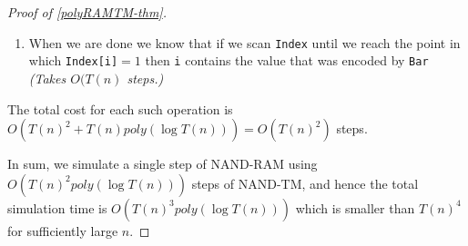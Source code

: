 \begin{proof}[Proof of \cref{polyRAMTM-thm}]
\begin{enumerate}
\begin{enumerate}
    \begin{itemize}
    \tightlist
    \item
      Decrease the number encoded temp by \(1\). \emph{(Take number of
      steps polynomial in \(\ell = \ceil{\log T(n)}\).)}
    \item
      Decrease \texttt{i} until it is equal to \(0\). \emph{(Take
      \(O(T(n)\) steps.)}
    \item
      Scan \texttt{Index} until we reach the point in which it equals
      \(1\) and then change this \(1\) to \(0\) and go one step further
      and write \(1\) in this location. \emph{(Takes \(O(T(n))\)
      steps.)}
    \end{itemize}
  \item
    When we are done we know that if we scan \texttt{Index} until we
    reach the point in which \texttt{Index[i]}\(=1\) then \texttt{i}
    contains the value that was encoded by \texttt{Bar} \emph{(Takes
    \(O(T(n)\) steps.)}
  \end{enumerate}
\end{enumerate}

The total cost for each such operation is
\(O(T(n)^2 + T(n)poly(\log T(n))) = O(T(n)^2)\) steps.

In sum, we simulate a single step of NAND-RAM using
\(O(T(n)^2 poly(\log T(n)))\) steps of NAND-TM, and hence the total
simulation time is \(O(T(n)^3 poly(\log T(n)))\) which is smaller than
\(T(n)^4\) for sufficiently large \(n\).

\end{proof}


